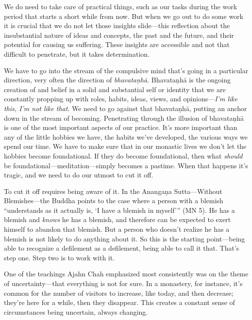 We do need to take care of practical things, such as our tasks during 
the work period that starts a short while from now. But when we go out 
to do some work it is crucial that we do not let those insights 
slide---this reflection about the insubstantial nature of ideas and 
concepts, the past and the future, and their potential for causing us 
suffering. These insights are accessible and not that difficult to 
penetrate, but it takes determination.

We have to go into the stream of the compulsive mind that's going in a 
particular direction, very often the direction of \emph{bhavataṇhā}. 
Bhavataṇhā is the ongoing creation of and belief in a solid and 
substantial self or identity that we are constantly propping up with 
roles, habits, ideas, views, and opinions---\emph{I'm like this, I'm 
not like that}. We need to go against that bhavataṇhā, putting an 
anchor down in the stream of becoming. Penetrating through the illusion 
of bhavataṇhā is one of the most important aspects of our practice. 
It's more important than any of the little hobbies we have, the habits 
we've developed, the various ways we spend our time. We have to make 
sure that in our monastic lives we don't let the hobbies become 
foundational. If they do become foundational, then what \emph{should} 
be foundational---meditation---simply becomes a pastime. When that 
happens it's tragic, and we need to do our utmost to cut it off.

To cut it off requires being aware of it. In the Anangaṇa 
Sutta---Without Blemishes---the Buddha points to the case where a 
person with a blemish ``understands as it actually is, `I have a 
blemish in myself'\thinspace'' (MN 5). He has a blemish and 
\emph{knows} he has a blemish, and therefore can be expected to exert 
himself to abandon that blemish. But a person who doesn't realize he 
has a blemish is not likely to do anything about it. So this is the 
starting point---being able to recognize a defilement as a defilement, 
being able to call it that. That's step one. Step two is to work with 
it.


One of the teachings Ajahn Chah emphasized most consistently was on the 
theme of uncertainty---that everything is not for sure. In a monastery, 
for instance, it's common for the number of visitors to increase, like 
today, and then decrease; they're here for a while, then they 
disappear. This creates a constant sense of circumstances being 
uncertain, always changing.

